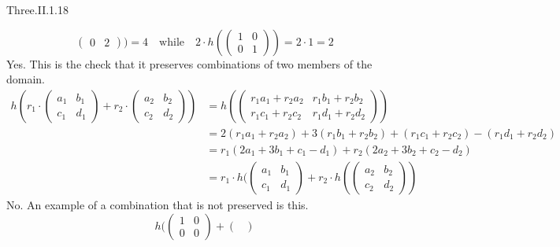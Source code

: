 \begin{ans}{Three.II.1.18}
\begin{exparts*}
\begin{equation*}
\begin{pmatrix}
                0  &2
              \end{pmatrix})
            =4
            \quad\text{while}\quad
            2\cdot h(\begin{pmatrix}
                1  &0  \\
                0  &1
              \end{pmatrix})
            =2\cdot 1=2
          \end{equation*}
        \partsitem Yes.
           This is the check that it preserves combinations of two members of
           the domain.
           \begin{align*}
             h(r_1\cdot\begin{pmatrix} a_1 &b_1 \\ c_1 &d_1 \end{pmatrix}
               +r_2\cdot\begin{pmatrix} a_2 &b_2 \\ c_2 &d_2 \end{pmatrix})
             &=h(\begin{pmatrix}
                   r_1a_1+r_2a_2 &r_1b_1+r_2b_2   \\
                   r_1c_1+r_2c_2 &r_1d_1+r_2d_2
                 \end{pmatrix})                                 \\
             &=2(r_1a_1+r_2a_2)+3(r_1b_1+r_2b_2)
                    +(r_1c_1+r_2c_2)-(r_1d_1+r_2d_2)              \\
             &=r_1(2a_1+3b_1+c_1-d_1)
               +r_2(2a_2+3b_2+c_2-d_2)              \\
             &=r_1\cdot h(\begin{pmatrix} a_1 &b_1 \\ c_1 &d_1 \end{pmatrix}
               +r_2\cdot h(\begin{pmatrix} a_2 &b_2 \\ c_2 &d_2 \end{pmatrix})
           \end{align*}
        \partsitem No.
          An example of a combination that is not preserved is this.
          \begin{equation*}
            h(\begin{pmatrix}
              1  &0  \\
              0  &0
            \end{pmatrix}
            +\begin{pmatrix}

\end{pmatrix}
\end{equation*}
\end{exparts*}
\end{ans}
